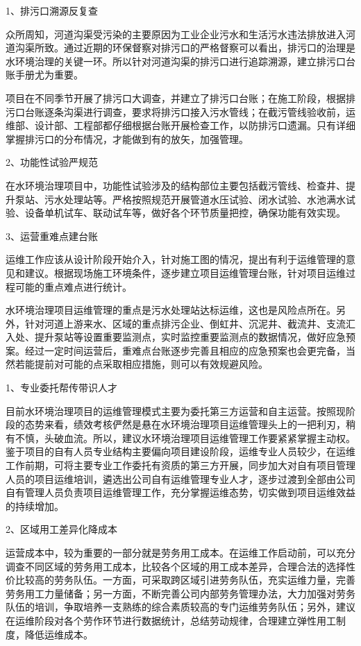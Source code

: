 \documentclass[
]{book}
\begin{document}
1、排污口溯源反复查

众所周知，河道沟渠受污染的主要原因为工业企业污水和生活污水违法排放进入河道沟渠所致。通过近期的环保督察对排污口的严格督察可以看出，排污口的治理是水环境治理的关键一环。所以针对河道沟渠的排污口进行追踪溯源，建立排污口台账手册尤为重要。

项目在不同季节开展了排污口大调查，并建立了排污口台账；在施工阶段，根据排污口台账逐条沟渠进行调查，要求将排污口接入污水管线；在截污管线验收前，运维部、设计部、工程部都仔细根据台账开展检查工作，以防排污口遗漏。只有详细掌握排污口的分布情况，才能做到有的放矢，加强管理。

2、功能性试验严规范

在水环境治理项目中，功能性试验涉及的结构部位主要包括截污管线、检查井、提升泵站、污水处理站等。严格按照规范开展管道水压试验、闭水试验、水池满水试验、设备单机试车、联动试车等，做好各个环节质量把控，确保功能有效实现。

3、运营重难点建台账

运维工作应该从设计阶段开始介入，针对施工图的情况，提出有利于运维管理的意见和建议。根据现场施工环境条件，逐步建立项目运维管理台账，针对项目运维过程可能的重点难点进行统计。

水环境治理项目运维管理的重点是污水处理站达标运维，这也是风险点所在。另外，针对河道上游来水、区域的重点排污企业、倒虹井、沉泥井、截流井、支流汇入处、提升泵站等设置重要监测点，实时监控重要监测点的数据情况，做好应急预案。经过一定时间运营后，重难点台账逐步完善且相应的应急预案也会更完备，当然若能提前对可能的点采取相应措施，则可以有效规避风险。

1、专业委托帮传带识人才

目前水环境治理项目的运维管理模式主要为委托第三方运营和自主运营。按照现阶段的态势来看，绩效考核俨然是悬在水环境治理项目运维管理头上的一把利刃，稍有不慎，头破血流。所以，建议水环境治理项目运维管理工作要紧紧掌握主动权。鉴于项目的自有人员专业结构主要偏向项目建设阶段，运维专业人员较少，在运维工作前期，可将主要专业工作委托有资质的第三方开展，同步加大对自有项目管理人员的项目运维培训，遴选出公司自有运维管理专业人才，逐步过渡到全部由公司自有管理人员负责项目运维管理工作，充分掌握运维态势，切实做到项目运维效益的持续增加。

2、区域用工差异化降成本

运营成本中，较为重要的一部分就是劳务用工成本。在运维工作启动前，可以充分调查不同区域的劳务用工成本，比较各个区域的用工成本差异，合理合法的选择性价比较高的劳务队伍。一方面，可采取跨区域引进劳务队伍，充实运维力量，完善劳务用工力量储备；另一方面，不断完善公司内部劳务管理办法，大力加强对劳务队伍的培训，争取培养一支熟练的综合素质较高的专门运维劳务队伍；另外，建议在运维阶段对各个劳作环节进行数据统计，总结劳动规律，合理建立弹性用工制度，降低运维成本。
\end{document}
